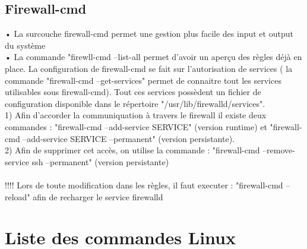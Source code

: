 \documentclass[a4paper, 11pt, french, oneside]{book}
\begin{document}
			\section{Firewall-cmd}
			• La surcouche firewall-cmd permet une gestion plus facile des input et output du système\\
			• La commande "firewll-cmd --list-all permet d'avoir un aperçu des règles déjà en place. La configuration de firewall-cmd se fait sur l'autorisation de services ( la commande "firewall-cmd --get-services" permet de connaitre tout les services utilisables sous firewall-cmd). Tout ces services possèdent un fichier de configuration disponible dans le répertoire "/usr/lib/firewalld/services".\\
			
			
			
			
			1) Afin d'accorder la communiquation à travers le firewall il existe deux commandes : "firewall-cmd --add-service SERVICE" (version runtime) et "firewall-cmd --add-service SERVICE --permanent" (version persistante).\\
			2) Afin de supprimer cet accès, on utilise la commande : "firewall-cmd --remove-service ssh --permanent" (version persistante) \\
\\
			!!!! Lors de toute modification dans les règles, il faut executer : "firewall-cmd –reload" afin de recharger le service firewalld \\
	\chapter{Liste des commandes Linux}
\end{document}
